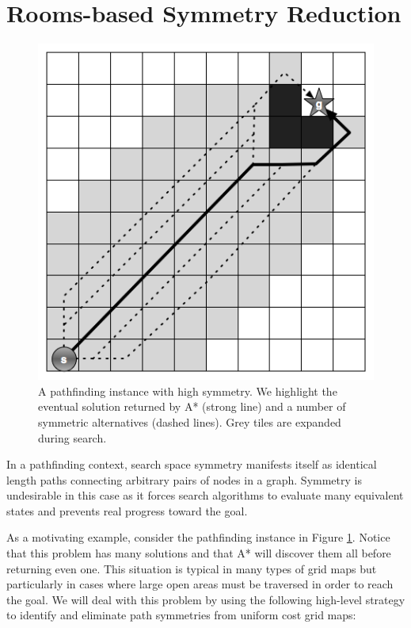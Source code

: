 \section{Rooms-based Symmetry Reduction}
\begin{figure}[]
       \begin{center}
                       \includegraphics[scale=0.30]{diagrams/symmetry_example.png}
       \end{center}
       \caption{A pathfinding instance with high symmetry. We highlight the
eventual solution returned by A* (strong line) and a number of symmetric 
alternatives (dashed lines). Grey tiles are expanded during search. }
       \label{fig-symmetry}
		\vspace{-0.5em}
\end{figure}
In a pathfinding context, search space symmetry manifests itself as identical
length paths connecting arbitrary pairs of nodes in a graph. 
Symmetry is undesirable in this case as it forces search algorithms to evaluate 
many equivalent states and prevents real progress toward the goal.

As a motivating example, consider the pathfinding instance in Figure
\ref{fig-symmetry}. Notice that this problem has many solutions and that A* will
discover them all before returning even one. This situation is typical in many
types of grid maps but particularly in cases where large open areas must be
traversed in order to reach the goal.
We will deal with this problem by using the following high-level strategy to
identify and eliminate path symmetries from uniform cost grid maps:



